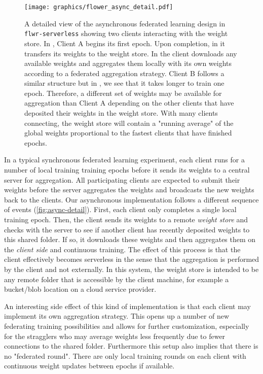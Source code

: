 \documentclass[twocolumn, switch]{article} %
\begin{document}
\begin{figure}
    \centering
    \texttt{[image: graphics/flower\_async\_detail.pdf]}
    \caption{A detailed view of the asynchronous federated learning design in \texttt{flwr-serverless} showing two clients interacting with the weight store. In , Client A begins its first epoch. Upon completion, in  it transfers its weights to the weight store. In  the client downloads any available weights and aggregates them locally with its own weights according to a federated aggregation strategy. Client B follows a similar structure but in , we see that it takes longer to train one epoch. Therefore, a different set of weights may be available for aggregation than Client A depending on the other clients that have deposited their weights in the weight store. With many clients connecting, the weight store will contain a "running average" of the global weights proportional to the fastest clients that have finished epochs.}
    \label{fig:async-detail}
\end{figure}

In a typical synchronous federated learning experiment, each client runs for a number of local training training epochs before it sends its weights to a central server for aggregation. All participating clients are expected to submit their weights before the server aggregates the weights and broadcasts the new weights back to the clients. Our asynchronous implementation follows a different sequence of events (\autoref{fig:async-detail}). First, each client only completes a single local training epoch. Then, the client sends its weights to a remote \textit{weight store} and checks with the server to see if another client has recently deposited weights to this shared folder. If so, it downloads these weights and then aggregates them on the \textit{client side} and continuous training. The effect of this process is that the client effectively becomes serverless in the sense that the aggregation is performed by the client and not externally. In this system, the weight store is intended to be any remote folder that is accessible by the client machine, for example a bucket/blob location on a cloud service provider.

An interesting side effect of this kind of implementation is that each client may implement its own aggregation strategy. This opens up a number of new federating training possibilities and allows for further customization, especially for the stragglers who may average weights less frequently due to fewer connections to the shared folder. Furthermore this setup also implies that there is no "federated round". There are only local training rounds on each client with continuous weight updates between epochs if available. 
\end{document}
